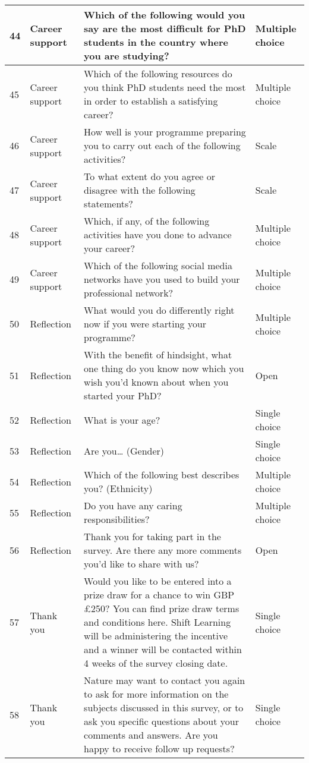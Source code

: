 \documentclass[
]{article}
\begin{document}
\begin{tabular}{l|l|l|l}
\hline
44 & Career support & Which of the following would you say are the most difficult for PhD students in the country where you are studying? & Multiple choice\\
\hline
45 & Career support & Which of the following resources do you think PhD students need the most in order to establish a satisfying career? & Multiple choice\\
\hline
46 & Career support & How well is your programme preparing you to carry out each of the following activities? & Scale\\
\hline
47 & Career support & To what extent do you agree or disagree with the following statements? & Scale\\
\hline
48 & Career support & Which, if any, of the following activities have you done to advance your career? & Multiple choice\\
\hline
49 & Career support & Which of the following social media networks have you used to build your professional network? & Multiple choice\\
\hline
50 & Reflection & What would you do differently right now if you were starting your programme? & Multiple choice\\
\hline
51 & Reflection & With the benefit of hindsight, what one thing do you know now which you wish you’d known about when you started your PhD? & Open\\
\hline
52 & Reflection & What is your age? & Single choice\\
\hline
53 & Reflection & Are you… (Gender) & Single choice\\
\hline
54 & Reflection & Which of the following best describes you? (Ethnicity) & Multiple choice\\
\hline
55 & Reflection & Do you have any caring responsibilities? & Multiple choice\\
\hline
56 & Reflection & Thank you for taking part in the survey. Are there any more comments you’d like to share with us? & Open\\
\hline
57 & Thank you & Would you like to be entered into a prize draw for a chance to win GBP £250? You can find prize draw terms and conditions here. Shift Learning will be administering the incentive and a winner will be contacted within 4 weeks of the survey closing date. & Single choice\\
\hline
58 & Thank you & Nature may want to contact you again to ask for more information on the subjects discussed in this survey, or to ask you specific questions about your comments and answers. Are you happy to receive follow up requests? & Single choice\\

\end{tabular}
\end{document}
